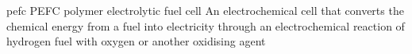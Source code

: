 \newglsXacronym%
{pefc}%
{PEFC}%
{polymer electrolytic fuel cell}%
{An electrochemical cell that converts the chemical energy from a fuel into electricity through an electrochemical reaction of hydrogen fuel with oxygen or another oxidising agent}%